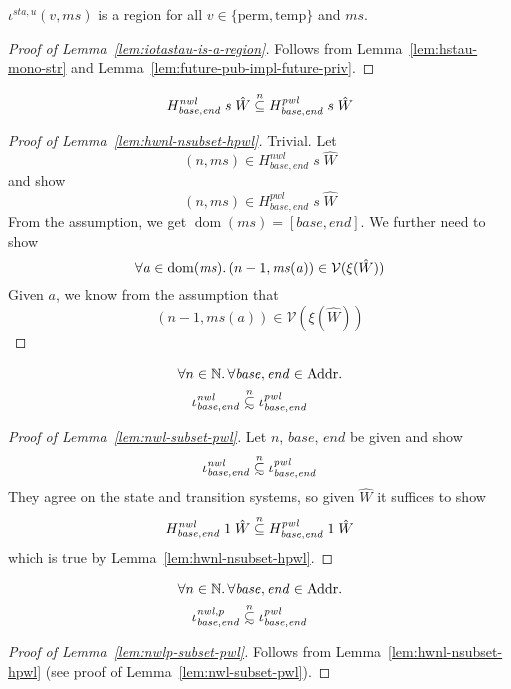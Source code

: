 \documentclass[a4paper]{article}
\newcommand\subsetsim{\mathrel{\ooalign{\raise.2ex\hbox{$\subset$}\cr
      \hidewidth\lower.8ex\hbox{\scalebox{0.9}{$\sim$}}\hidewidth\cr}}}
\newcommand{\nsubsim}[1][n]{\stackrel{\tiny{#1}}{\subsetsim}}
\newcommand{\nsubeq}[1][n]{\stackrel{\tiny{#1}}{\subseteq}}
\DeclareMathOperator{\dom}{dom}
\newcommand{\var}[1]{\mathit{#1}}
\newcommand{\hs}{\var{ms}}
\newcommand{\ms}{\hs}
\newcommand{\addr}{\var{a}}
\newcommand{\start}{\var{base}}
\newcommand{\addrend}{\var{end}}
\newcommand{\nwl}{\var{nwl}}
\newcommand{\pwl}{\var{pwl}}
\newcommand{\sta}{\var{sta}}
\newcommand{\asmType}{\plaindom{AsmType}}
\newcommand{\plaindom}[1]{\mathrm{#1}}
\newcommand{\Addrs}{\plaindom{Addr}}
\newcommand{\nats}{\mathbb{N}}
\newcommand{\intr}[2]{\mathcal{#1}}
\newcommand{\valueintr}[1]{\intr{V}{#1}}
\newcommand{\stdvr}{\valueintr{\asmType}}
\newcommand{\npair}[2][n]{\left(#1,#2 \right)}
\newcommand{\plainview}[1]{\mathrm{#1}}
\newcommand{\perma}{\plainview{perm}}
\newcommand{\temp}{\plainview{temp}}
\begin{document}
\begin{lemma}
  \label{lem:iotastau-is-a-region}
  $\iota^{\sta,u}(v,\ms)$ is a region for all $v \in \{\perma, \temp\}$ and $\ms$.
\end{lemma}
\begin{proof}[Proof of Lemma~\ref{lem:iotastau-is-a-region}]
  Follows from Lemma~\ref{lem:hstau-mono-str} and Lemma~\ref{lem:future-pub-impl-future-priv}.
\end{proof}

\begin{lemma}
  \label{lem:hwnl-nsubset-hpwl}
  \[
    H^\nwl_{\start,\addrend} \; s\; \hat{W} \nsubeq H^\pwl_{\start,\addrend} \; s\; \hat{W}
  \]
\end{lemma}
\begin{proof}[Proof of Lemma~\ref{lem:hwnl-nsubset-hpwl}]
  Trivial. Let
  \[
    \npair{\ms} \in H^\nwl_{\start,\addrend} \; s\; \hat{W}
  \]
  and show
  \[
    \npair{\ms} \in H^\pwl_{\start,\addrend} \; s\; \hat{W}
  \]
  From the assumption, we get $\dom(\ms) = [\start,\addrend]$. We further need to show
  \[
    \forall \addr \in \dom(\ms) \ldotp \npair[n-1]{\ms(\addr)} \in \stdvr(\xi(\hat{W}))
  \]
  Given $\addr$, we know from the assumption that
  \[
    \npair[n-1]{\ms(\addr)} \in \stdvr(\xi(\hat{W}))
  \]
\end{proof}

\begin{lemma}
  \label{lem:nwl-subset-pwl}
  \begin{align*}
    & \forall n \in \nats\ldotp \forall \start, \addrend \in \Addrs \ldotp  \\
    & \quad \iota^\nwl_{\start,\addrend} \nsubsim \iota^\pwl_{\start,\addrend}
  \end{align*}
\end{lemma}
\begin{proof}[Proof of Lemma~\ref{lem:nwl-subset-pwl}]
  Let $n$, $\start$, $\addrend$ be given and show
  \[
    \iota^\nwl_{\start,\addrend} \nsubsim \iota^\pwl_{\start,\addrend}
  \]
  They agree on the state and transition systems, so given $\hat{W}$ it suffices to show
  \[
    H^\nwl_{\start,\addrend} \; 1\; \hat{W} \nsubeq H^\pwl_{\start,\addrend} \; 1\; \hat{W}  
  \]
  which is true by Lemma~\ref{lem:hwnl-nsubset-hpwl}.
\end{proof}

\begin{lemma}
  \label{lem:nwlp-subset-pwl}
  \begin{align*}
    & \forall n \in \nats\ldotp \forall \start, \addrend \in \Addrs \ldotp  \\
    & \quad \iota^{\nwl,p}_{\start,\addrend}  \nsubsim \iota^\pwl_{\start,\addrend}
  \end{align*}
\end{lemma}
\begin{proof}[Proof of Lemma~\ref{lem:nwlp-subset-pwl}]
  Follows from Lemma~\ref{lem:hwnl-nsubset-hpwl} (see proof of Lemma~\ref{lem:nwl-subset-pwl}).
\end{proof}
\end{document}
